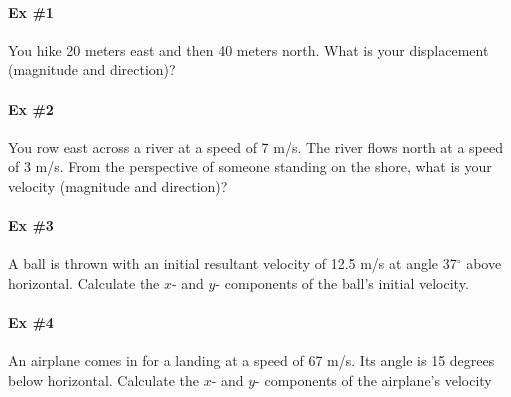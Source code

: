 \documentclass[11pt]{article}
\begin{document}
\pagestyle{empty}

\paragraph{Ex \#1} 

You hike 20 meters east and then 40 meters north.  What is your displacement (magnitude and direction)?

\pagebreak

\paragraph{Ex \#2} 

You row east across a river at a speed of 7 m/s.  The river flows north at a speed of 3 m/s.  From the perspective of someone standing on the shore, what is your velocity (magnitude and direction)?

\pagebreak

\paragraph{Ex \#3} 

A ball is thrown with an initial resultant velocity of 12.5 m/s at angle 37$^\circ$ above horizontal.  Calculate the $x$- and $y$- components of the ball's initial velocity.


\pagebreak

\paragraph{Ex \#4} 

An airplane comes in for a landing at a speed of 67 m/s.  Its angle is 15 degrees below horizontal.  Calculate the $x$- and $y$- components of the airplane's velocity

\end{document}
